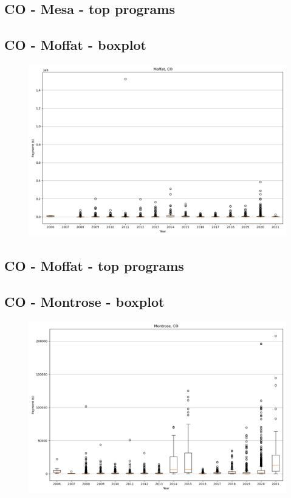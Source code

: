 \subsection*{CO - Mesa - top programs}

\newpage
\subsection*{CO - Moffat - boxplot}
\begin{figure}[h]
\centering
\includegraphics[width=7in]{../output/boxplots/counties/Moffat-CO_boxplot.png}
\end{figure}


\subsection*{CO - Moffat - top programs}

\newpage
\subsection*{CO - Montrose - boxplot}
\begin{figure}[h]
\centering
\includegraphics[width=7in]{../output/boxplots/counties/Montrose-CO_boxplot.png}
\end{figure}


